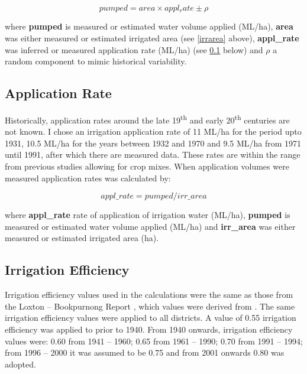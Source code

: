 \documentclass[a4paper, titlepage, 12pt]{article}\usepackage[]{graphicx}\usepackage[]{color}
\begin{document}
\begin{sffamily}
\begin{equation}  \label{eqn01}
  pumped  = area \times appl_rate \pm \rho
\end{equation} 
 
where \textbf{pumped} is measured or estimated water volume applied (ML/ha), \textbf{area} was either measured or estimated irrigated area (see \ref{irrarea} above), \textbf{appl\_rate} was inferred or measured application rate (ML/ha) (see \ref{apprate} below) and \textbf{$\rho$} a random component to mimic historical variability.

\subsection{Application Rate} \label{apprate} Historically, application rates around the late 19\textsuperscript{th} and early 20\textsuperscript{th} centuries are not known. I chose an irrigation application rate of 11 ML/ha for the period upto 1931, 10.5 ML/ha for the years between 1932 and 1970 and 9.5 ML/ha from 1971 until 1991, after which there are measured data. These rates are within the range from previous studies \citep{Meissner2014, Meissner2012, Meissner2011a, Meissner2011b} allowing for crop mixes. When application volumes were measured application rates was calculated by:

\begin{equation}  \label{eqn02}
 appl\_rate = pumped / irr\_area 
\end{equation}

where \textbf{appl\_rate} rate of application of irrigation water (ML/ha), \textbf{pumped} is measured or estimated water volume applied (ML/ha) and \textbf{irr\_area} was either measured or estimated irrigated area (ha).

\subsection{Irrigation Efficiency} \label{irreff} Irrigation efficiency values used in the calculations were the same as those from the Loxton -- Bookpurnong Report \citep{Meissner2011a}, which values were derived from \citep{Adams2009}. The same irrigation efficiency values were applied to all districts.  A value of 0.55 irrigation efficiency was applied to prior to 1940. From 1940 onwards, irrigation efficiency values were: 0.60 from 1941 -- 1960; 0.65 from 1961 -- 1990; 0.70 from 1991 -- 1994; from 1996 -- 2000 it was assumed to be 0.75 and from 2001 onwards 0.80 was adopted.


\end{sffamily}
\end{document}
